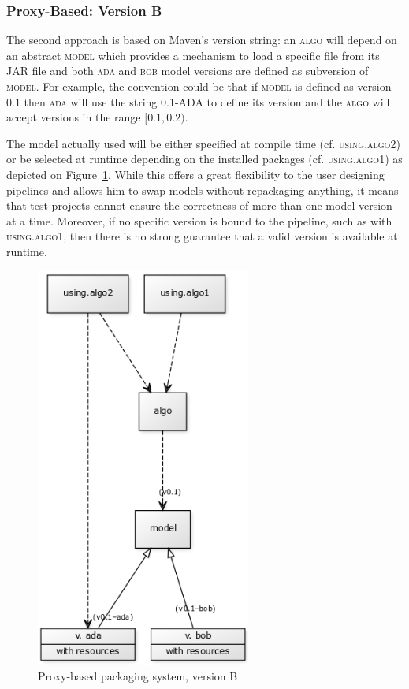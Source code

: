 \documentclass{article}
\newcommand{\ID}[1]{{\textsc{#1}}}
\newcommand{\JAR}{JAR\xspace}
\begin{document}
\begin{appendices}
\subsubsection{Proxy-Based: Version B}

The second approach is based on Maven's version string: an \ID{algo} will depend on an abstract
\ID{model} which provides a mechanism to load a specific file from its \JAR file and both \ID{ada}
and \ID{bob} model versions are defined as subversion of \ID{model}. For example, the convention
could be that if \ID{model} is defined as version \ID{0.1} then \ID{ada} will use the string
\ID{0.1-ADA} to define its version and the \ID{algo} will accept versions in the range $ [0.1,0.2)
$.

The model actually used will be either specified at compile time (cf. \ID{using.algo2}) or be
selected at runtime depending on the installed packages (cf. \ID{using.algo1}) as depicted on
Figure~\ref{fig:pkgsysB}. While this offers a great flexibility to the user designing pipelines and
allows him to swap models without repackaging anything, it means that test projects cannot ensure
the correctness of more than one model version at a time. Moreover, if no specific version is bound
to the pipeline, such as with \ID{using.algo1}, then there is no strong guarantee that a valid
version is available at runtime.

\begin{figure}
    \centering
    \includegraphics[width=200pt]{res/packaging_version_B.png}
    \caption{Proxy-based packaging system, version B}
    \label{fig:pkgsysB}
\end{figure}



\end{appendices}
\end{document}
